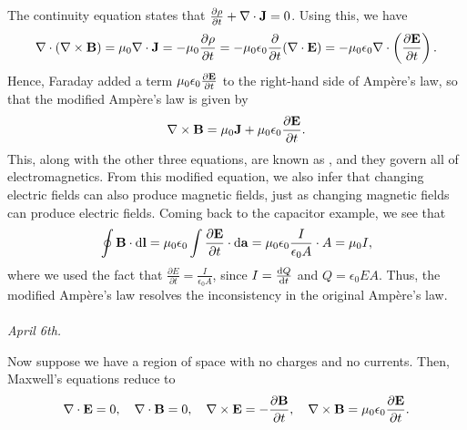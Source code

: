 The continuity equation states that $\frac{\partial \rho}{\partial t} + \nabla \cdot \mathbf{J} = 0$. Using this, we have
\begin{align}
    \nabla \cdot (\nabla \times \mathbf{B}) = \mu_{0} \nabla \cdot \mathbf{J} = -\mu_{0} \frac{\partial \rho}{\partial t} = -\mu_{0} \epsilon_{0} \frac{\partial}{\partial t} (\nabla \cdot \mathbf{E}) = -\mu_{0} \epsilon_{0} \nabla \cdot \left( \frac{\partial{\mathbf{E}}}{\partial{t}} \right).
\end{align}
Hence, Faraday added a term $\mu_{0} \epsilon_{0} \frac{\partial{\mathbf{E}}}{\partial{t}}$ to the right-hand side of Ampère's law, so that the modified Ampère's law is given by
\begin{align}
    \nabla \times \mathbf{B} = \mu_{0} \mathbf{J} + \mu_{0} \epsilon_{0} \frac{\partial{\mathbf{E}}}{\partial{t}}.
\end{align}
This, along with the other three equations, are known as , and they govern all of electromagnetics. From this modified equation, we also infer that changing electric fields can also produce magnetic fields, just as changing magnetic fields can produce electric fields. Coming back to the capacitor example, we see that
\begin{align}
    \oint \mathbf{B} \cdot \mathrm{d}\mathbf{l} = \mu_{0} \epsilon_{0} \int \frac{\partial \mathbf{E}}{\partial t} \cdot \mathrm{d}\mathbf{a} = \mu_{0} \epsilon_{0} \frac{I}{\epsilon_{0}A} \cdot A = \mu_{0} I,
\end{align}
where we used the fact that $\frac{\partial E}{\partial t} = \frac{I}{\epsilon_{0}A}$, since $I = \frac{\mathrm{d}Q}{\mathrm{d}t}$ and $Q = \epsilon_{0} EA$. Thus, the modified Ampère's law resolves the inconsistency in the original Ampère's law.
\\ \\
\textit{April 6th.}

Now suppose we have a region of space with no charges and no currents. Then, Maxwell's equations reduce to
\begin{align}
\nabla \cdot \mathbf{E} = 0, \quad \nabla \cdot \mathbf{B} = 0, \quad \nabla \times \mathbf{E} = -\frac{\partial{\mathbf{B}}}{\partial{t}}, \quad \nabla \times \mathbf{B} = \mu_{0} \epsilon_{0} \frac{\partial{\mathbf{E}}}{\partial{t}}.
\end{align}


